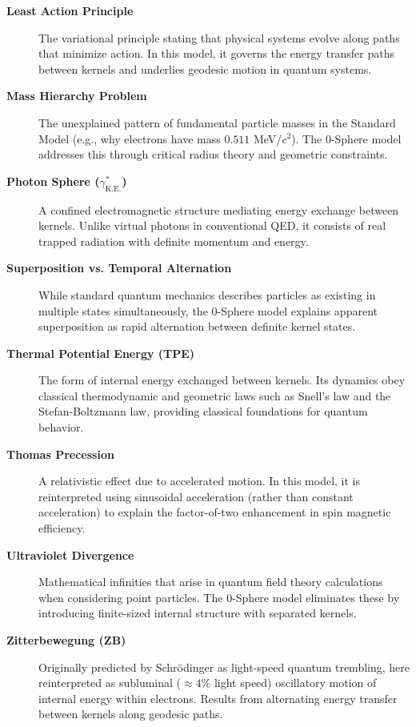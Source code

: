 \documentclass[%
 reprint,
 amsmath,amssymb,
 aps,
]{revtex4-1}
\numberwithin{equation}{section}%
\begin{document}
\begin{description}
  \item[\textbf{Least Action Principle}] The variational principle stating that physical systems evolve along paths that minimize action. In this model, it governs the energy transfer paths between kernels and underlies geodesic motion in quantum systems.
  
  \item[\textbf{Mass Hierarchy Problem}] The unexplained pattern of fundamental particle masses in the Standard Model (e.g., why electrons have mass $0.511$ MeV/$c^{2}$). The 0-Sphere model addresses this through critical radius theory and geometric constraints.
  
  \item[\textbf{Photon Sphere ($\gamma^*_{\mathrm{K.E.}}$)}] A confined electromagnetic structure mediating energy exchange between kernels. Unlike virtual photons in conventional QED, it consists of real trapped radiation with definite momentum and energy.
  
  \item[\textbf{Superposition vs. Temporal Alternation}] While standard quantum mechanics describes particles as existing in multiple states simultaneously, the 0-Sphere model explains apparent superposition as rapid alternation between definite kernel states.
  
  \item[\textbf{Thermal Potential Energy (TPE)}] The form of internal energy exchanged between kernels. Its dynamics obey classical thermodynamic and geometric laws such as Snell's law and the Stefan-Boltzmann law, providing classical foundations for quantum behavior.
  
  \item[\textbf{Thomas Precession}] A relativistic effect due to accelerated motion. In this model, it is reinterpreted using sinusoidal acceleration (rather than constant acceleration) to explain the factor-of-two enhancement in spin magnetic efficiency.
  
  \item[\textbf{Ultraviolet Divergence}] Mathematical infinities that arise in quantum field theory calculations when considering point particles. The 0-Sphere model eliminates these by introducing finite-sized internal structure with separated kernels.
  
  \item[\textbf{Zitterbewegung (ZB)}] Originally predicted by Schr\"{o}dinger as light-speed quantum trembling, here reinterpreted as subluminal ($\approx 4\%$ light speed) oscillatory motion of internal energy within electrons. Results from alternating energy transfer between kernels along geodesic paths.
\end{description}
\end{document}
